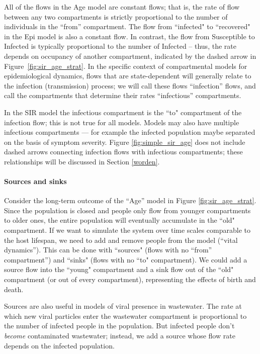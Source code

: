 All of the flows in the Age model are constant \pc flows; that is, the rate of flow between any two compartments is strictly proportional to the number of individuals in the ``from'' compartment. 
The flow from ``infected" to ``recovered" in the Epi model is also a constant \pc flow. In contrast, the \pc flow from Susceptible to Infected is typically proportional to the number of Infected -- thus, the \pc rate depends on occupancy of another compartment, indicated by the dashed arrow in Figure~\ref{fig:sir_age_strat}. In the specific context of compartmental models for epidemiological dynamics, \pc flows that are state-dependent will generally relate to the infection (transmission) process; we will call these flows ``infection'' flows, and call the compartments that determine their rates ``infectious'' compartments.

In the SIR model the infectious compartment is the ``to" compartment of the infection flow; this is not true for all models.  Models may also have multiple infectious compartments --- for example the infected population maybe separated on the basis of symptom severity. Figure \ref{fig:simple_sir_age} does not include dashed arrows connecting infection flows with infectious compartments; these relationships will be discussed in Section \ref{worden}.

\paragraph{Sources and sinks}

Consider the long-term outcome of the ``Age'' model in Figure \ref{fig:sir_age_strat}. Since the population is closed and people only flow from younger compartments to older ones, the entire population will eventually accumulate in the ``old" compartment. If we want to simulate the system over time scales comparable to the host lifespan, we need to add and remove people from the model (``vital dynamics''). This can be done with ``sources" (flows with no ``from'' compartment'') and ``sinks" (flows with no ``to" compartment). We could add a source flow into the ``young" compartment and a sink flow out of the ``old" compartment (or out of every compartment), representing the effects of birth and death. 

Sources are also useful in models of viral presence in wastewater. The rate at which new viral particles enter the wastewater compartment is proportional to the number of infected people in the population. But infected people don't \emph{become} contaminated wastewater; instead, we add a source whose flow rate depends on the infected population.

